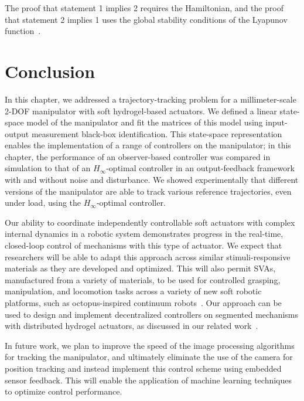 The proof that statement 1 implies 2 requires the Hamiltonian, and the proof that statement 2 implies 1 uses the global stability conditions of the Lyapunov function~\cite{Boyd1994}.
\section{Conclusion}

In this chapter, we addressed a trajectory-tracking problem for a millimeter-scale 2-DOF manipulator with soft hydrogel-based actuators. We defined a linear state-space model of the manipulator and fit the matrices of this model using input-output measurement black-box identification. This state-space representation enables the implementation of a range of controllers on the manipulator; in this chapter, the performance of an observer-based controller was compared in simulation to that of an $H_{\infty}$-optimal controller in an output-feedback framework with and without noise and disturbance. We showed experimentally that different versions of the manipulator are able to track various reference trajectories, even under load, using the $H_{\infty}$-optimal controller.

Our ability to coordinate independently controllable soft actuators with complex internal dynamics in a robotic system demonstrates progress in the real-time, closed-loop control of mechanisms with this type of actuator. We expect that researchers will be able to adapt this approach across similar stimuli-responsive materials as they are developed and optimized. This will also permit SVAs, manufactured from a variety of materials, to be used for controlled grasping, manipulation, and locomotion tasks across a variety of new soft robotic platforms, such as octopus-inspired continuum robots~\cite{Doroudchi2020}. Our approach can be used to design and implement decentralized controllers on segmented mechanisms with distributed hydrogel actuators, as discussed in our related work~\cite{Doroudchi2020,Doroudchi2019}.

In future work, we plan to improve the speed of the image processing algorithms for tracking the manipulator, and ultimately eliminate the use of the camera for position tracking and instead implement this control scheme using embedded sensor feedback.  This will enable the application of machine learning techniques to optimize control performance.

